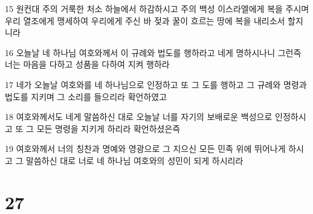 \par 15 원컨대 주의 거룩한 처소 하늘에서 하감하시고 주의 백성 이스라엘에게 복을 주시며 우리 열조에게 맹세하여 우리에게 주신 바 젖과 꿀이 흐르는 땅에 복을 내리소서 할지니라
\par 16 오늘날 네 하나님 여호와께서 이 규례와 법도를 행하라고 네게 명하시나니 그런즉 너는 마음을 다하고 성품을 다하여 지켜 행하라
\par 17 네가 오늘날 여호와를 네 하나님으로 인정하고 또 그 도를 행하고 그 규례와 명령과 법도를 지키며 그 소리를 들으리라 확언하였고
\par 18 여호와께서도 네게 말씀하신 대로 오늘날 너를 자기의 보배로운 백성으로 인정하시고 또 그 모든 명령을 지키게 하리라 확언하셨은즉
\par 19 여호와께서 너의 칭찬과 명예와 영광으로 그 지으신 모든 민족 위에 뛰어나게 하시고 그 말씀하신 대로 너로 네 하나님 여호와의 성민이 되게 하시리라

\chapter{27}

